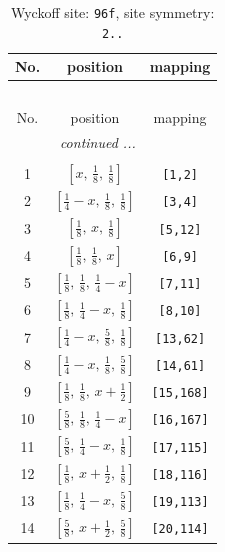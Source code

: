 \documentclass[fleqn,8pt]{jsarticle}
\begin{document}
\begin{longtable}{ccc}
\caption{Wyckoff site: {\tt 96f}, site symmetry: {\tt 2..}}
 \\
 \hline \hline
No. & position & mapping \\ \hline \endfirsthead

\multicolumn{2}{l}{\tablename\ \thetable{}} \\
 \hline \hline
No. & position & mapping \\ \hline \endhead

 \hline \hline
\multicolumn{2}{r}{\footnotesize\it continued ...} \\ \endfoot

 \hline \hline
\multicolumn{2}{r}{} \\ \endlastfoot

1 & $\left[ x,\, \frac{1}{8},\, \frac{1}{8} \right]$ & {\tt [1,2]} \\ \hline
2 & $\left[ \frac{1}{4} - x,\, \frac{1}{8},\, \frac{1}{8} \right]$ & {\tt [3,4]} \\ \hline
3 & $\left[ \frac{1}{8},\, x,\, \frac{1}{8} \right]$ & {\tt [5,12]} \\ \hline
4 & $\left[ \frac{1}{8},\, \frac{1}{8},\, x \right]$ & {\tt [6,9]} \\ \hline
5 & $\left[ \frac{1}{8},\, \frac{1}{8},\, \frac{1}{4} - x \right]$ & {\tt [7,11]} \\ \hline
6 & $\left[ \frac{1}{8},\, \frac{1}{4} - x,\, \frac{1}{8} \right]$ & {\tt [8,10]} \\ \hline
7 & $\left[ \frac{1}{4} - x,\, \frac{5}{8},\, \frac{1}{8} \right]$ & {\tt [13,62]} \\ \hline
8 & $\left[ \frac{1}{4} - x,\, \frac{1}{8},\, \frac{5}{8} \right]$ & {\tt [14,61]} \\ \hline
9 & $\left[ \frac{1}{8},\, \frac{1}{8},\, x + \frac{1}{2} \right]$ & {\tt [15,168]} \\ \hline
10 & $\left[ \frac{5}{8},\, \frac{1}{8},\, \frac{1}{4} - x \right]$ & {\tt [16,167]} \\ \hline
11 & $\left[ \frac{5}{8},\, \frac{1}{4} - x,\, \frac{1}{8} \right]$ & {\tt [17,115]} \\ \hline
12 & $\left[ \frac{1}{8},\, x + \frac{1}{2},\, \frac{1}{8} \right]$ & {\tt [18,116]} \\ \hline
13 & $\left[ \frac{1}{8},\, \frac{1}{4} - x,\, \frac{5}{8} \right]$ & {\tt [19,113]} \\ \hline
14 & $\left[ \frac{5}{8},\, x + \frac{1}{2},\, \frac{5}{8} \right]$ & {\tt [20,114]} \\ \hline

\end{longtable}
\end{document}
